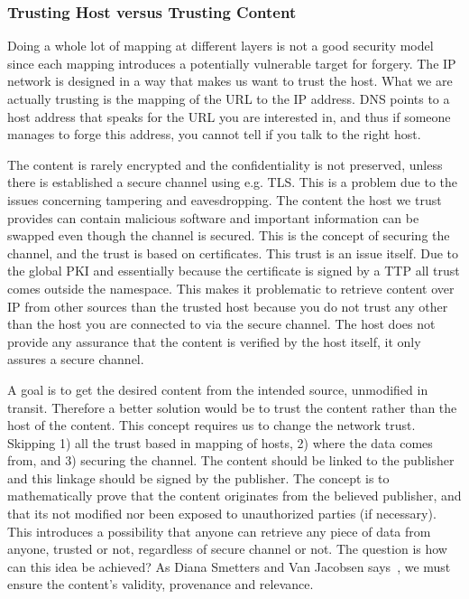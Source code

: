 
\subsubsection{Trusting Host versus Trusting Content}
Doing a whole lot of mapping at different layers is not a good security model since each mapping introduces a potentially vulnerable target for forgery.
The \gls{IP} network is designed in a way that makes us want to trust the host.
What we are actually trusting is the mapping of the \gls{URL} to the \gls{IP} address.
\gls{DNS} points to a host address that speaks for the \gls{URL} you are interested in, and thus if someone manages to forge this address, you cannot tell if you talk to the right host.

The content is rarely encrypted and the confidentiality is not preserved, unless there is established a secure channel using e.g. \gls{TLS}.
This is a problem due to the issues concerning tampering and eavesdropping.
The content the host we trust provides can contain malicious software and important information can be swapped even though the channel is secured.
This is the concept of securing the channel, and the trust is based on certificates.
This trust is an issue itself. 
Due to the global \gls{PKI} and essentially because the certificate is signed by a \gls{TTP} all trust comes outside the namespace.
This makes it problematic to retrieve content over \gls{IP} from other sources than the trusted host because you do not trust any other than the host you are connected to via the secure channel.
The host does not provide any assurance that the content is verified by the host itself, it only assures a secure channel.

A goal is to get the desired content from the intended source, unmodified in transit.
Therefore a better solution would be to trust the content rather than the host of the content.
This concept requires us to change the network trust.
Skipping 1) all the trust based in mapping of hosts, 2) where the data comes from, and 3) securing the channel.
The content should be linked to the publisher and this linkage should be signed by the publisher. 
The concept is to mathematically prove that the content originates from the believed publisher, and that its not modified nor been exposed to unauthorized parties (if necessary).
This introduces a possibility that anyone can retrieve any piece of data from anyone, trusted or not, regardless of secure channel or not.
The question is how can this idea be achieved? 
As Diana Smetters and Van Jacobsen says~\cite{secure-network-content}, we must ensure the content's validity, provenance and relevance.

